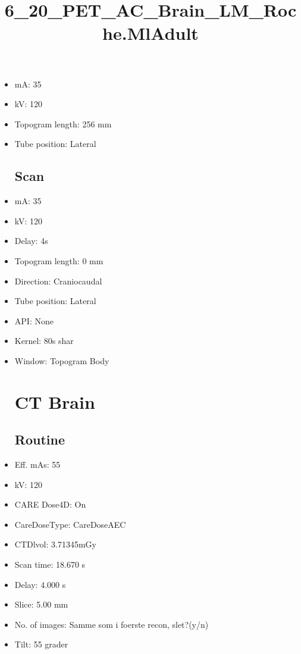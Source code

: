 \documentclass[12pt]{article}
\title{6\_20\_PET\_AC\_Brain\_LM\_Roche.MlAdult}
\begin{document}
\maketitle
\newpage
\tableofcontents
\newpage
{}


\begin{itemize}\section{Topogram}
\subsection{Routine}
\item mA: 35\item kV: 120\item Topogram length: 256 mm\item Tube position: Lateral
\subsection{Scan}\item mA: 35\item kV: 120\item Delay: 4s\item Topogram length: 0 mm\item Direction: Craniocaudal\item Tube position: Lateral\item API: None\item Kernel: 80s shar\item Window: Topogram Body
\section{CT Brain }
\subsection{Routine}
\item Eff. mAs: 55\item kV: 120\item CARE Dose4D: On\item CareDoseType: CareDoseAEC\item CTDlvol: 3.71345mGy\item Scan time: 18.670 s\item Delay: 4.000 s\item Slice: 5.00 mm\item No. of images: Samme som i foerste recon, slet?(y/n)\item Tilt: 55 grader

\end{itemize}
\end{document}
